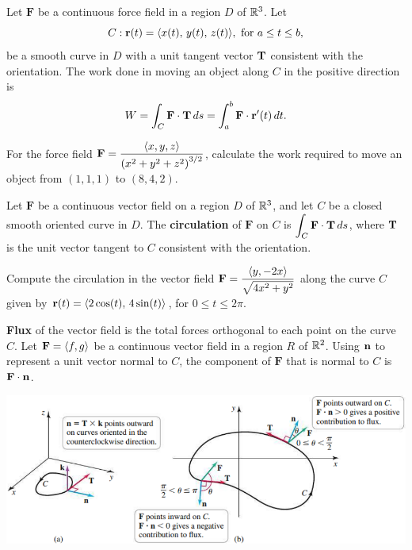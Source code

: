 \documentclass[mathNotesPreamble]{subfiles}
\begin{document}
  \begin{defn*}
    Let $\mathbf F$ be a continuous force field in a region $D$ of $\mathbb{R}^3$. Let
      \[C: {\mathbf{r}}(t)={\left\langle x(t),\,y(t),\,z(t) \right\rangle}, \textnormal{ for } a\leq t\leq b,\]
    be a smooth curve in $D$ with a unit tangent vector ${\mathbf{T}}$ consistent with the orientation. The work done in moving an object along $C$ in the positive direction is
      \[W=\int_C \mathbf F\cdot{\mathbf{T}}\,ds=\int_a^b \mathbf F\cdot{\mathbf{r}}'(t)\,dt.\]
  \end{defn*}
  \begin{ex*}
    For the force field $\mathbf F=\dfrac{{\left\langle x,y,z \right\rangle}}{{\left(x^2+y^2+z^2\right)}^{3/2}}$, calculate the work required to move an object from $(1,1,1)$ to $(8,4,2)$.
  \end{ex*}
  \pagebreak

  \begin{defn*}[Circulation]
    Let $\mathbf F$ be a continuous vector field on a region $D$ of $\mathbb{R}^3$, and let $C$ be a closed smooth oriented curve in $D$. The \textbf{circulation} of $\mathbf F$ on $C$ is $\displaystyle\int_C \mathbf F\cdot{\mathbf{T}}\,ds$, where ${\mathbf{T}}$ is the unit vector tangent to $C$ consistent with the orientation. 
  \end{defn*}

  \begin{ex*}
    Compute the circulation in the vector field $\mathbf F=\dfrac{{\left\langle y,-2x \right\rangle}}{\sqrt{4x^2+y^2}}$ along the curve $C$ given by ${\mathbf{r}}(t)={\left\langle 2\cos(t),\,4\sin(t) \right\rangle}$, for $0\leq t\leq 2\pi$.
  \end{ex*}
  \pagebreak

  \textbf{Flux} of the vector field is the total forces orthogonal to each point on the curve $C$. Let $\mathbf F={\left\langle f,g \right\rangle}$ be a continuous vector field in a region $R$ of $\mathbb{R}^2$. Using ${\mathbf{n}}$ to represent a unit vector normal to $C$, the component of $\mathbf F$ that is normal to $C$ is $\mathbf F\cdot{\mathbf{n}}$. 
  \begin{center}
    \includegraphics[width=0.95\linewidth]{images/briggs_17_02/fig17_26}
  \end{center}
\end{document}
